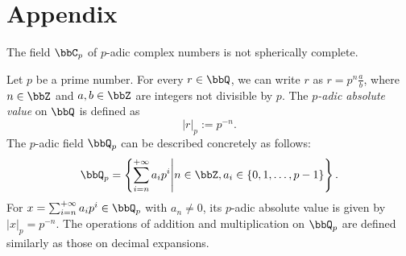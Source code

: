 \section{Appendix}

    \begin{proposition}\label{prop:C_p_is_not_spherically_complete}
        The field \(\bbC_p\) of \(p\)-adic complex numbers is not spherically complete.
    \end{proposition}

    \begin{example}\label{eg:p-adic_field}
        Let \(p\) be a prime number. 
        For every \(r \in \bbQ\), we can write \(r\) as \(r = p^n \frac{a}{b}\), where \(n \in \bbZ\) and \(a,b \in \bbZ\) are integers not divisible by \(p\).
        The \emph{\(p\)-adic absolute value} on \(\bbQ\) is defined as
        \[ |r|_p := p^{-n}. \]
        The \(p\)-adic field \(\bbQ_p\) can be described concretely as follows:
        \[ \bbQ_p = \left\{ \sum_{i = n}^{+\infty} a_i p^i \middle| n \in \bbZ, a_i \in \{0, 1, \ldots, p-1\} \right\}. \]
        For \(x = \sum_{i = n}^{+\infty} a_i p^i \in \bbQ_p\) with \(a_n \neq 0\), its \(p\)-adic absolute value is given by \(|x|_p = p^{-n}\).
        The operations of addition and multiplication on \(\bbQ_p\) are defined similarly as those on decimal expansions.
    \end{example}